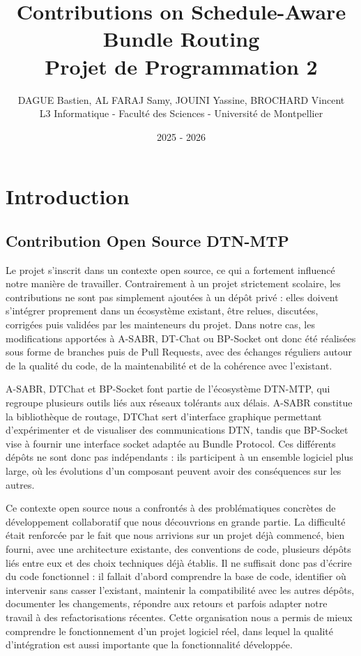 \documentclass{article}
\title{Contributions on Schedule-Aware Bundle Routing \\ \Large Projet de Programmation 2 }
\author{DAGUE Bastien, AL FARAJ Samy, JOUINI Yassine, BROCHARD Vincent \\ \small L3 Informatique - Faculté des Sciences - Université de Montpellier}
\date{2025 - 2026}
\begin{document}
\maketitle
{\small
\tableofcontents
}

\newpage
\printglossary[type=\acronymtype, title={Glossaire et Abréviations}, style=altlist]

\newpage
\section{Introduction}
\subsection{Contribution Open Source DTN-MTP}
Le projet s’inscrit dans un contexte open source, ce qui a fortement influencé notre manière de travailler. Contrairement à un projet strictement scolaire, les contributions ne sont pas simplement ajoutées à un dépôt privé : elles doivent s’intégrer proprement dans un écosystème existant, être relues, discutées, corrigées puis validées par les mainteneurs du projet. Dans notre cas, les modifications apportées à A-SABR, DT-Chat ou BP-Socket ont donc été réalisées sous forme de branches puis de Pull Requests, avec des échanges réguliers autour de la qualité du code, de la maintenabilité et de la cohérence avec l’existant.

A-SABR, DTChat et BP-Socket font partie de l’écosystème DTN-MTP, qui regroupe plusieurs outils liés aux réseaux tolérants aux délais. A-SABR constitue la bibliothèque de routage, DTChat sert d’interface graphique permettant d’expérimenter et de visualiser des communications DTN, tandis que BP-Socket vise à fournir une interface socket adaptée au Bundle Protocol. Ces différents dépôts ne sont donc pas indépendants : ils participent à un ensemble logiciel plus large, où les évolutions d’un composant peuvent avoir des conséquences sur les autres.

Ce contexte open source nous a confrontés à des problématiques concrètes de développement collaboratif que nous découvrions en grande partie. La difficulté était renforcée par le fait que nous arrivions sur un projet déjà commencé, bien fourni, avec une architecture existante, des conventions de code, plusieurs dépôts liés entre eux et des choix techniques déjà établis. Il ne suffisait donc pas d’écrire du code fonctionnel : il fallait d’abord comprendre la base de code, identifier où intervenir sans casser l’existant, maintenir la compatibilité avec les autres dépôts, documenter les changements, répondre aux retours et parfois adapter notre travail à des refactorisations récentes. Cette organisation nous a permis de mieux comprendre le fonctionnement d’un projet logiciel réel, dans lequel la qualité d’intégration est aussi importante que la fonctionnalité développée.
\end{document}
